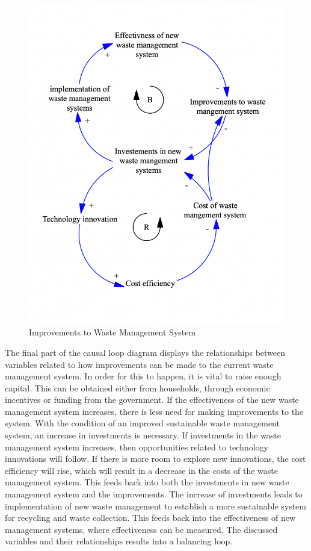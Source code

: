 \begin{figure}[H]
\centering
\includegraphics [scale=0.32,angle=360]{figures/improvements.png}
\caption{Improvements to Waste Management System}
\label{fig:improvements}
\end{figure}

\indent \newline
The final part of the causal loop diagram displays the relationships between variables related to how improvements can be made to the current waste management system. In order for this to happen, it is vital to raise enough capital. This can be obtained either from households, through economic incentives or funding from the government. If the effectiveness of the new waste management system increases, there is less need for making improvements to the system. With the condition of an improved sustainable waste management system, an increase in investments is necessary. If investments in the waste management system increases, then  opportunities related to technology innovations will follow. If there is more room to explore new innovations, the cost efficiency will rise, which will result in a decrease in the costs of the waste management system. This feeds back into both the investments in new waste management system and the improvements. The increase of investments leads to implementation of new waste management to establish a more sustainable system for recycling and waste collection. This feeds back into the effectiveness of new management systems, where effectiveness can be measured. The discussed variables and their relationships results into a balancing loop. 

